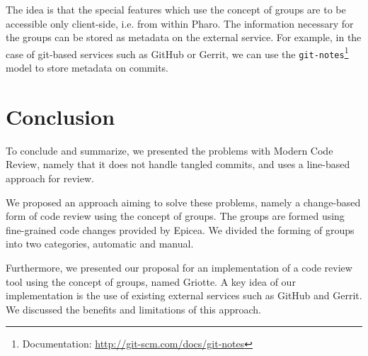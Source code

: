 \documentclass[conference,a4paper]{IEEEtran}
\newcommand{\Ep}{Epicea}
\newcommand{\Gr}{Griotte}
\newcommand{\code}[1]{\texttt{#1}}
\begin{document}
The idea is that the special features which use the concept of groups
are to be accessible only client-side, i.e. from within Pharo. The
information necessary for the groups can be stored as metadata on the
external service. For example, in the case of git-based services such
as GitHub or Gerrit, we can use the
\code{git-notes}\footnote{Documentation: \url{http://git-scm.com/docs/git-notes}}
model to store metadata on commits.

\section{Conclusion}
\label{sec:conclusion}
To conclude and summarize, we presented the problems with Modern Code
Review, namely that it does not handle tangled commits, and uses a
line-based approach for review.

We proposed an approach aiming to solve these problems, namely a
change-based form of code review using the concept of groups. The
groups are formed using fine-grained code changes provided by \Ep. We
divided the forming of groups into two categories, automatic and manual.

Furthermore, we presented our proposal for an implementation of a code
review tool using the concept of groups, named \Gr. A key idea of our
implementation is the use of existing external services such as GitHub
and Gerrit. We discussed the benefits and limitations of this
approach.



\end{document}
